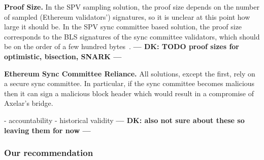 \noindent\textbf{Proof Size.}
In the SPV sampling solution, the proof size depends on the number of sampled
(Ethereum validators') signatures, so it is unclear at this point how large it
should be. In the SPV sync committee based solution, the proof size corresponds
to the BLS signatures of the sync committee validators, which should be on the
order of a few hundred bytes~\cite{sync-committee}.
\textbf{--- DK: TODO proof sizes for optimistic, bisection, SNARK ---}

\noindent\textbf{Ethereum Sync Committee Reliance.}
All solutions, except the first, rely on a secure sync committee. In
particular, if the sync committee becomes malicious then it can sign a
malicious block header which would result in a compromise of Axelar's bridge.

- accountability
- historical validity
\textbf{--- DK: also not sure about these so leaving them for now ---}

\subsubsection{Our recommendation}
